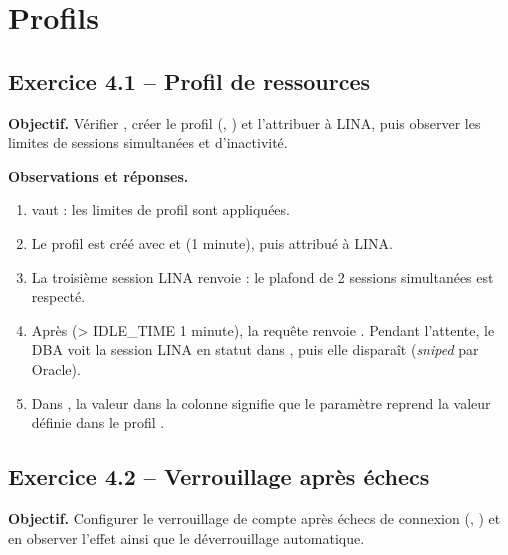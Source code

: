\section{Profils}

\subsection{Exercice 4.1 -- Profil de ressources}
\textbf{Objectif.} Vérifier , créer le profil 
(, ) et l'attribuer à LINA, puis observer
les limites de sessions simultanées et d'inactivité.


\textbf{Observations et réponses.}
\begin{enumerate}
  \item {} vaut  : les limites de profil sont appliquées.
  \item Le profil  est créé avec  et
         (1 minute), puis attribué à LINA.
  \item La troisième session LINA renvoie  : le plafond de 2 sessions simultanées est respecté.
  \item Après  (> IDLE\_TIME 1 minute), la requête renvoie
        . Pendant
        l'attente, le DBA voit la session LINA en statut  dans ,
        puis elle disparaît (\emph{sniped} par Oracle).
  \item Dans , la valeur  dans la colonne 
        signifie que le paramètre reprend la valeur définie dans le profil .
\end{enumerate}

\subsection{Exercice 4.2 -- Verrouillage après échecs}
\textbf{Objectif.} Configurer le verrouillage de compte après échecs de connexion
(, ) et en observer
l'effet ainsi que le déverrouillage automatique.

